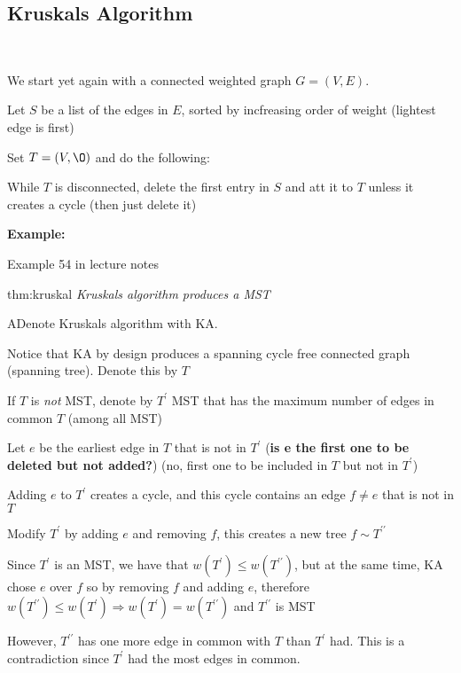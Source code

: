 \subsection{Kruskals Algorithm}\hfill\\\par
\noindent We start yet again with a connected weighted graph $G = (V,E)$.
\par\bigskip
\noindent Let $S$ be a list of the edges in $E$, sorted by incfreasing order of weight (lightest edge is first)
\par\bigskip
\noindent Set $T = (V,\O)$ and do the following:
\par\bigskip
\noindent While $T$ is disconnected, delete the first entry in $S$ and att it to $T$ unless it creates a cycle (then just delete it)
\par\bigskip
\noindent\textbf{Example:}\par
Example 54 in lecture notes 
\par\bigskip
\begin{theo}{thm:kruskal}
  \textit{Kruskals algorithm produces a MST}
\end{theo}
\par\bigskip
\begin{prf}
  ADenote Kruskals algorithm with KA.
  \par\bigskip
  \noindent Notice that KA by design produces a spanning cycle free connected graph (spanning tree). Denote this by $T$
  \par\bigskip
  \noindent If $T$ is \textit{not} MST, denote by $T^{\prime}$ MST that has the maximum number of edges in common $T$ (among all MST)
  \par\bigskip
  \noindent Let $e$ be the earliest edge in $T$ that is not in  $T^{\prime}$ (\textbf{is e the first one to be deleted but not added?}) (no, first one to be included in $T$ but not in $T^{\prime}$)
  \par\bigskip
  \noindent Adding $e$ to $T^{\prime}$ creates a cycle, and this cycle contains an edge $f\neq e$ that is not in $T$
  \par\bigskip
  \noindent Modify $T^{\prime}$ by adding $e$ and removing $f$, this creates a new tree $f\sim T^{\prime\prime}$
  \par\bigskip
  \noindent Since $T^{\prime}$ is an MST, we have that $w(T^{\prime})\leq w(T^{\prime\prime})$, but at the same time, KA chose $e$ over $f$ so by removing $f$ and adding $e$, therefore $w(T^{\prime\prime})\leq w(T^{\prime})\Rightarrow w(T^{\prime}) = w(T^{\prime\prime})$ and $T^{\prime\prime}$ is MST
  \par\bigskip
  \noindent However, $T^{\prime\prime}$ has one more edge in common with $T$ than $T^{\prime}$ had. This is a contradiction since $T^{\prime}$ had the most edges in common. 
\end{prf}
